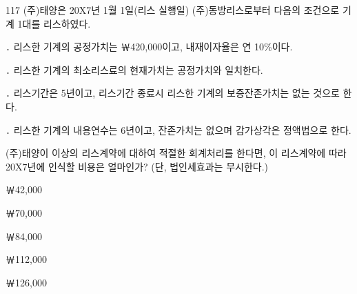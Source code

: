 \begin{question}{117}
(주)태양은 20X7년 1월 1일(리스 실행일) (주)동방리스로부터 다음의 조건으로 기계 1대를 리스하였다.
\begin{framedtext}
․ 리스한 기계의 공정가치는 ￦420,000이고, 내재이자율은 연 10\%이다. \par
․ 리스한 기계의 최소리스료의 현재가치는 공정가치와 일치한다. \par
․ 리스기간은 5년이고, 리스기간 종료시 리스한 기계의 보증잔존가치는 없는 것으로 한다. \par
․ 리스한 기계의 내용연수는 6년이고, 잔존가치는 없으며 감가상각은 정액법으로 한다.
\end{framedtext}
(주)태양이 이상의 리스계약에 대하여 적절한 회계처리를 한다면, 이 리스계약에 따라 20X7년에 인식할 비용은 얼마인가? (단, 법인세효과는 무시한다.) \par
\begin{choices}
  \item ￦42,000
  \item ￦70,000
  \item ￦84,000
  \item ￦112,000
  \item ￦126,000
\end{choices}
\end{question}

